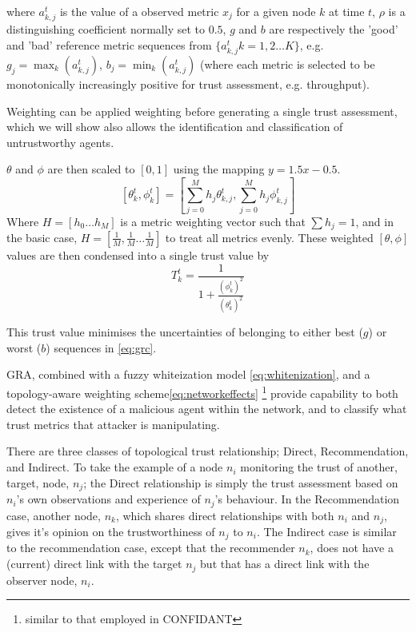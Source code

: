 \documentclass[runningheads,a4paper]{llncs}
\begin{document}
where $a_{k,j}^t$ is the value of a observed metric $x_j$ for a given node $k$ at time $t$, $\rho$ is a distinguishing coefficient normally set to $0.5$, $g$ and $b$ are respectively the 'good' and 'bad' reference metric sequences from $\{a_{k,j}^t k=1,2\dots K\}$, e.g. $g_j=\max_k({a_{k,j}^t})$,  $b_j=\min_k({a_{k,j}^t})$ (where each metric is selected to be monotonically increasingly positive for trust assessment, e.g. throughput). 

Weighting can be applied weighting before generating a single trust assessment, which we will show also allows the identification and classification of untrustworthy agents.

$\theta$ and $\phi$ are then scaled to $[0,1]$ using the mapping $y = 1.5 x - 0.5$.
\begin{equation}
  \label{eq:metric_weighting}
  [\theta_k^t, \phi_k^t] = \left[\sum_{j=0}^M h_j \theta_{k,j}^t,\sum_{j=0}^M h_j \phi_{k,j}^t \right]
\end{equation}
Where $H=[h_0\dots h_M]$ is a metric weighting vector such that $\sum h_j = 1$, and in the basic case, $H=[\frac{1}{M},\frac{1}{M}\dots\frac{1}{M}]$ to treat all metrics evenly.
These weighted $[\theta,\phi]$ values are then condensed into a single trust value by
\begin{equation}
  \label{eq:trustvalue}
  T_k^t = \frac{1}{1+\frac{(\phi_k^t)^2}{(\theta_k^t)^2}}
\end{equation}

This trust value minimises the uncertainties of belonging to either best ($g$) or worst ($b$) sequences in \eqref{eq:grc}.

GRA, combined with a fuzzy whiteization model \eqref{eq:whitenization}, and a topology-aware weighting scheme\eqref{eq:networkeffects} \footnote{similar to that employed in CONFIDANT} provide capability to both detect the existence of a malicious agent within the network, and to classify what trust metrics that attacker is manipulating.

There are three classes of topological trust relationship; Direct, Recommendation, and Indirect.
To take the example of a node $n_i$ monitoring the trust of another, target, node, $n_j$; the Direct relationship is simply the trust assessment based on $n_i$'s own observations and experience of $n_j$'s behaviour.
In the Recommendation case, another node, $n_k$, which shares direct relationships with both $n_i$ and $n_j$, gives it's opinion on the trustworthiness of $n_j$ to $n_i$.
The Indirect case is similar to the recommendation case, except that the recommender $n_k$, does not have a (current) direct link with the target $n_j$ but that has a direct link with the observer node, $n_i$.
\end{document}

